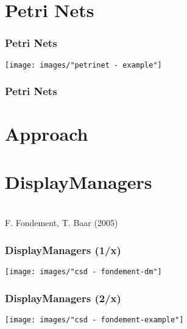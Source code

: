 \section{Petri Nets}
\begin{frame}
  \frametitle{Petri Nets}

  \centering
  \hspace{-1cm}
  \texttt{[image: images/"petrinet - example"]}
\end{frame}

\begin{frame}
  \frametitle{Petri Nets}
  \hspace*{-.5cm}
\end{frame}


\section{Approach}

\section{DisplayManagers}
\begin{frame}
  \hspace{-1cm}
  \large
   \\
  \hspace{-1cm}
  \small
  F. Fondement, T. Baar (2005)
\end{frame}


\begin{frame}
  \frametitle{DisplayManagers (1/x)}
  \hspace{-1cm}
  \texttt{[image: images/"csd - fondement-dm"]}
\end{frame}


\begin{frame}
  \frametitle{DisplayManagers (2/x)}
  \hspace{-1cm}
  \texttt{[image: images/"csd - fondement-example"]}
\end{frame}


